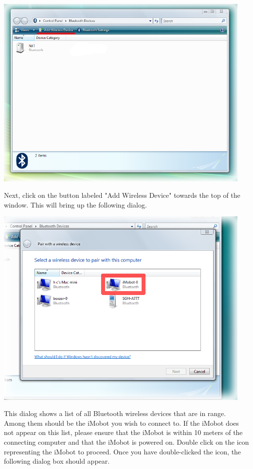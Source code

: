 \documentclass[11pt]{report}
\begin{document}
\begin{center}
\includegraphics[width=5in]{images/imobot_connect_1a.png}
\end{center}

Next, click on the
button labeled "Add Wireless Device" towards the top of the window. This 
will bring up the following dialog.

\begin{center}
\includegraphics[width=5in]{images/imobot_connect_2.png}
\end{center}

This dialog shows a list of all Bluetooth wireless devices that are in range.
Among them should be the iMobot you wish to connect to. If the iMobot does not
appear on this list, please ensure that the iMobot is within 10 meters of the
connecting computer and that the iMobot is powered on. Double click on the icon
representing the iMobot to proceed. Once you have double-clicked the icon, the
following dialog box should appear.
\end{document}
